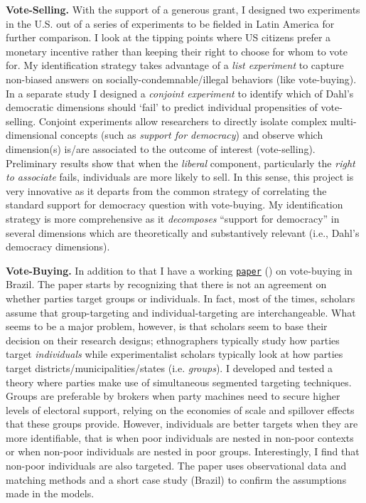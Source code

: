 {\bf Vote-Selling.} With the support of a generous grant, I designed two experiments in the U.S. out of a series of experiments to be fielded in Latin America for further comparison. I look at the tipping points where US citizens prefer a monetary incentive rather than keeping their right to choose for whom to vote for. My identification strategy takes advantage of a \emph{list experiment} to capture non-biased answers on socially-condemnable/illegal behaviors (like vote-buying). In a separate study I designed a \emph{conjoint experiment} to identify which of Dahl's democratic dimensions should `fail' to predict individual propensities of vote-selling. Conjoint experiments allow researchers to directly isolate complex multi-dimensional concepts (such as \emph{support for democracy}) and observe which dimension(s) is/are associated to the outcome of interest (vote-selling). Preliminary results show that when the \emph{liberal} component, particularly the \emph{right to associate} fails, individuals are more likely to sell. In this sense, this project is very innovative as it departs from the common strategy of correlating the standard support for democracy question with vote-buying. My identification strategy is more comprehensive as it \emph{decomposes} ``support for democracy'' in several dimensions which are theoretically and substantively relevant (i.e., Dahl's democracy dimensions). 

{\bf Vote-Buying.} In addition to that I have a working \href{https://github.com/hbahamonde/Clientelism_paper/raw/master/Bahamonde_Clientelism_Paper.pdf}{\texttt{paper}} (\emph{\unskip}) on vote-buying in Brazil. The paper starts by recognizing that there is not an agreement on whether parties target groups or individuals. In fact, most of the times, scholars assume that group-targeting and individual-targeting are interchangeable. What seems to be a major problem, however, is that scholars seem to base their decision on their research designs; ethnographers typically study how parties target \emph{individuals} while experimentalist scholars typically look at how parties target districts/municipalities/states (i.e. \emph{groups}). I developed and tested a theory where parties make use of simultaneous segmented targeting techniques. Groups are preferable by brokers when party machines need to secure higher levels of electoral support, relying on the economies of scale and spillover effects that these groups provide. However, individuals are better targets when they are more identifiable, that is when poor individuals are nested in non-poor contexts or when non-poor individuals are nested in poor groups. Interestingly, I find that non-poor individuals are also targeted. The paper uses observational data and matching methods and a short case study (Brazil) to confirm the assumptions made in the models.

